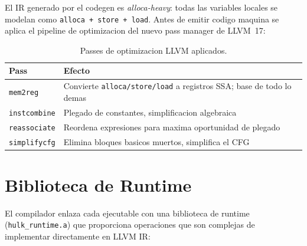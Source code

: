 \documentclass[12pt,a4paper]{article}
\begin{document}
El IR generado por el codegen es \textit{alloca-heavy}: todas las variables locales
se modelan como \texttt{alloca + store + load}. Antes de emitir codigo maquina se
aplica el pipeline de optimizacion del nuevo pass manager de LLVM~17:

\begin{table}[H]
\centering
\begin{tabular}{ll}
\toprule
\textbf{Pass} & \textbf{Efecto} \\
\midrule
\texttt{mem2reg} & Convierte \texttt{alloca/store/load} a registros SSA; base de todo lo demas \\
\texttt{instcombine} & Plegado de constantes, simplificacion algebraica \\
\texttt{reassociate} & Reordena expresiones para maxima oportunidad de plegado \\
\texttt{simplifycfg} & Elimina bloques basicos muertos, simplifica el CFG \\
\bottomrule
\end{tabular}
\caption{Passes de optimizacion LLVM aplicados.}
\end{table}

\section{Biblioteca de Runtime}

El compilador enlaza cada ejecutable con una biblioteca de runtime
(\texttt{hulk\_runtime.a}) que proporciona operaciones que son complejas de
implementar directamente en LLVM IR:
\end{document}
